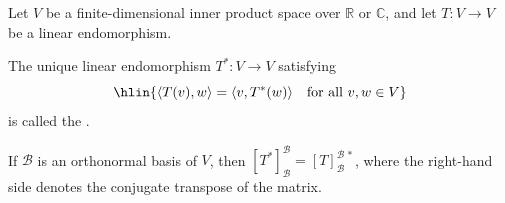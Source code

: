 \begin{definition} \label{definition:adjoint_of_a_linear_operator_on_an_inner_product_space}
    Let $V$ be a finite-dimensional inner product space over $\mathbb{R}$ or $\mathbb{C}$, and let $T: V \to V$ be a linear endomorphism.

    The unique linear endomorphism $T^*: V \to V$ satisfying
    $$\hlin{\langle T(v), w \rangle = \langle v, T^*(w) \rangle \quad \text{for all } v, w \in V}$$
    is called the .

    If $\mathcal{B}$ is an orthonormal basis of $V$, then $[T^*]_{\mathcal{B}}^{\mathcal{B}} = [T]_{\mathcal{B}}^{\mathcal{B}\,*}$, where the right-hand side denotes the conjugate transpose of the matrix.
\end{definition}
